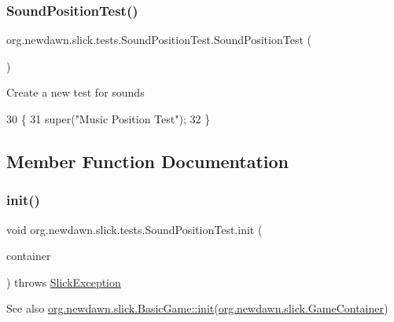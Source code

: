 \subsubsection{\texorpdfstring{Sound\+Position\+Test()}{SoundPositionTest()}}
{\footnotesize\ttfamily org.\+newdawn.\+slick.\+tests.\+Sound\+Position\+Test.\+Sound\+Position\+Test (\begin{DoxyParamCaption}{ }\end{DoxyParamCaption})\hspace{0.3cm}{\ttfamily [inline]}}

Create a new test for sounds 
\begin{DoxyCode}
30                                \{
31         super(\textcolor{stringliteral}{"Music Position Test"});
32     \}
\end{DoxyCode}


\subsection{Member Function Documentation}
\mbox{\label{classorg_1_1newdawn_1_1slick_1_1tests_1_1_sound_position_test_aaa4045baab87c36c541267a1d34a39ff}} 
\subsubsection{\texorpdfstring{init()}{init()}}
{\footnotesize\ttfamily void org.\+newdawn.\+slick.\+tests.\+Sound\+Position\+Test.\+init (\begin{DoxyParamCaption}\item[{\mbox{\hyperlink{classorg_1_1newdawn_1_1slick_1_1_game_container}{Game\+Container}}}]{container }\end{DoxyParamCaption}) throws \mbox{\hyperlink{classorg_1_1newdawn_1_1slick_1_1_slick_exception}{Slick\+Exception}}\hspace{0.3cm}{\ttfamily [inline]}}

\begin{DoxySeeAlso}{See also}
\mbox{\hyperlink{classorg_1_1newdawn_1_1slick_1_1_basic_game_a8af0900217e4d389249f71367b22d114}{org.\+newdawn.\+slick.\+Basic\+Game\+::init}}(\mbox{\hyperlink{classorg_1_1newdawn_1_1slick_1_1_game_container}{org.\+newdawn.\+slick.\+Game\+Container}}) 
\end{DoxySeeAlso}


